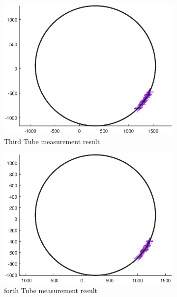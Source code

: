 \documentclass[12pt, twoside]{report}
\begin{document}
\begin{figure}[H]
     \hfill
     \begin{subfigure}[b]{0.4\textwidth}
         \centering
         \includegraphics[width=\textwidth]{TP_1/curve3.eps}
         \caption{Third Tube measurement result}
         \label{fig:Tube3}
     \end{subfigure}
      \hfill
     \begin{subfigure}[b]{0.4\textwidth}
         \centering
         \includegraphics[width=\textwidth]{TP_1/curve4.eps}
         \caption{forth Tube measurement result}
         \label{fig:Tube4}
     \end{subfigure}
      \hfill
     \begin{subfigure}[b]{0.4\textwidth}

\end{subfigure}
\end{figure}
\end{document}
